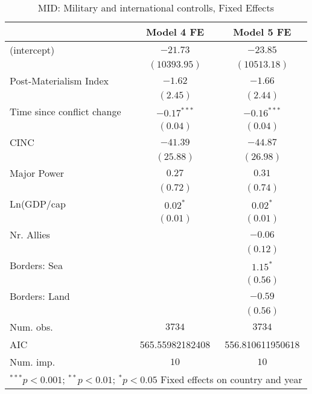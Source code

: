 
\begin{table}
\begin{center}
\begin{tabular}{l c c}
\toprule
 & Model 4 FE & Model 5 FE \\
\midrule
(intercept)                & $-21.73$        & $-23.85$         \\
                           & $(10393.95)$    & $(10513.18)$     \\
Post-Materialism Index     & $-1.62$         & $-1.66$          \\
                           & $(2.45)$        & $(2.44)$         \\
Time since conflict change & $-0.17^{***}$   & $-0.16^{***}$    \\
                           & $(0.04)$        & $(0.04)$         \\
CINC                       & $-41.39$        & $-44.87$         \\
                           & $(25.88)$       & $(26.98)$        \\
Major Power                & $0.27$          & $0.31$           \\
                           & $(0.72)$        & $(0.74)$         \\
Ln(GDP/cap                 & $0.02^{*}$      & $0.02^{*}$       \\
                           & $(0.01)$        & $(0.01)$         \\
Nr. Allies                 &                 & $-0.06$          \\
                           &                 & $(0.12)$         \\
Borders: Sea               &                 & $1.15^{*}$       \\
                           &                 & $(0.56)$         \\
Borders: Land              &                 & $-0.59$          \\
                           &                 & $(0.56)$         \\
\midrule
Num. obs.                  & $3734$          & $3734$           \\
AIC                        & 565.55982182408 & 556.810611950618 \\
Num. imp.                  & $10$            & $10$             \\
\bottomrule
\multicolumn{3}{l}{\scriptsize{$^{***}p<0.001$; $^{**}p<0.01$; $^{*}p<0.05$ 
 Fixed effects on country and year}}
\end{tabular}
\caption{MID: Military and international controlls, Fixed Effects}
\label{MID_2_FE_PM}
\end{center}
\end{table}
